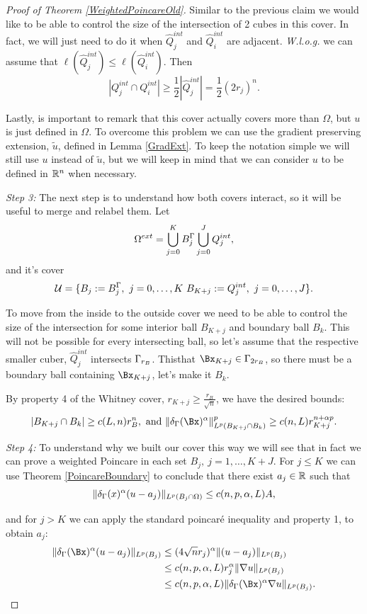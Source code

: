 \begin{proof}[Proof of Theorem \ref{WeightedPoincareOld}]
Similar to the previous claim we would like to be able to control the size of the intersection of 2 cubes in this cover. In fact, we will just need to do it when $\hat{Q}^{int}_{j}$ and $\hat{Q}^{int}_{i}$ are adjacent. \textit{W.l.o.g.} we can assume that $\ell(\hat{Q}^{int}_{j})\leq \ell(\hat{Q}^{int}_{i}) $. Then
$$|{Q}^{int}_{j}\cap {Q}^{int}_{i}|\geq \frac{1}{2}|\hat{Q}^{int}_{j}| =\frac{1}{2} (2 r_j)^n.$$

Lastly, is important to remark that this cover actually covers more than $\Omega$, but $u$ is just defined in $\Omega$. To overcome this problem we can use the gradient preserving extension, $\tilde{u}$, defined in Lemma \ref{GradExt}. To keep the notation simple we will still use $u$ instead of $\tilde{u}$, but we will keep in mind that we can consider $u$ to be defined in $\mathbb{R}^n$ when necessary.


\textit{Step 3:} The next step is to understand how both covers interact, so it will be useful to merge and relabel them. Let $$\Omega^{ext}=\bigcup_{j=0}^K B^\Gamma_j\bigcup_{j=0}^J Q^{int}_j,$$ and it's cover $$\mathcal{U}=\{B_j:=B^\GG_j,\ j =0,\ldots, K\ B_{K+j}:=Q^{int}_j,\ j=0,\ldots, J\}.$$ 


To move from the inside to the outside cover we need to be able to control the size of the intersection for some interior ball $B_{K+j}$ and boundary ball $B_k$. This will not be possible for every intersecting ball, so let's assume that the respective smaller cuber, $\hat{Q}^{int}_{j}$ intersects $\Gamma_{r_B}$. Thisthat $\Bx_{K+j}\in \GG_{2r_B}$, so there must be a boundary ball containing $\Bx_{K+j}$, let's make it $B_k$.

By property 4 of the Whitney cover,  $r_{K+j}\geq \frac{r_B}{\sqrt{n}}$, we have the desired bounds:
$$|B_{K+j}\cap B_{k}|\geq c(L,n) r^n_B,\text{   and   }  \|\delta_\GG(\Bx)^\alpha\|^p_{L^p \left(B_{K+j}\cap B_{k}\right)}\geq c(n,L) r_{K+j}^{n+\alpha p }.$$

\textit{Step 4:} To understand why we built our cover this way we will see that in fact we can prove a weighted Poincare in each set $B_j,\ j =1,\ldots, K+J$.  For $j\leq K$ we can use Theorem \ref{PoincareBoundary} to conclude that there exist $a_j\in \mathbb{R}$ such that
$$
\|\delta_\Gamma(x)^\alpha (u-a_j)\|_{L^p\left(B_j\cap \Omega\right)} \leq c(n,p,\alpha,L) A,
$$

and for $j>K$  we can apply the standard poincaré inequality and property 1, to obtain $a_j$:
\begin{align*}
    \|\delta_\GG(\Bx)^\alpha (u-a_j)\|_{L^p\left(B_j\right)} &\leq (4\sqrt{n}r_j)^\alpha\| (u-a_j)\|_{L^p\left(B_j\right)}\\
    &\leq c(n,p,\alpha,L)r_j^\alpha\| \nabla u\|_{L^p\left(B_j\right)}\\
    &\leq c(n,p,\alpha,L) \|\delta_\GG(\Bx)^\alpha \nabla u\|_{L^p\left(B_j\right)}.
\end{align*}


\end{proof}
